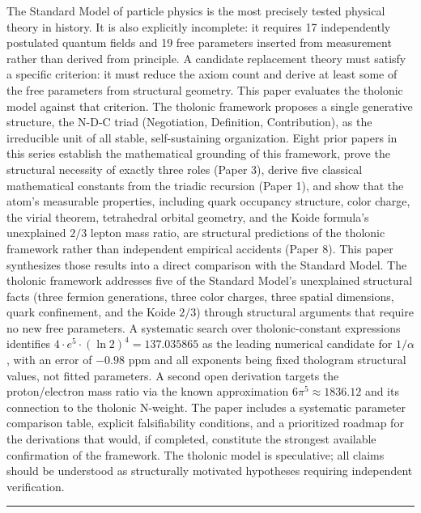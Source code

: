 \documentclass[
  11pt,
  letterpaper,
]{article}
\begin{document}
The Standard Model of particle physics is the most precisely tested
physical theory in history. It is also explicitly incomplete: it
requires 17 independently postulated quantum fields and 19 free
parameters inserted from measurement rather than derived from principle.
A candidate replacement theory must satisfy a specific criterion: it
must reduce the axiom count and derive at least some of the free
parameters from structural geometry. This paper evaluates the tholonic
model against that criterion. The tholonic framework proposes a single
generative structure, the N-D-C triad (Negotiation, Definition,
Contribution), as the irreducible unit of all stable, self-sustaining
organization. Eight prior papers in this series establish the
mathematical grounding of this framework, prove the structural necessity
of exactly three roles (Paper 3), derive five classical mathematical
constants from the triadic recursion (Paper 1), and show that the atom's
measurable properties, including quark occupancy structure, color
charge, the virial theorem, tetrahedral orbital geometry, and the Koide
formula's unexplained \(2/3\) lepton mass ratio, are structural
predictions of the tholonic framework rather than independent empirical
accidents (Paper 8). This paper synthesizes those results into a direct
comparison with the Standard Model. The tholonic framework addresses
five of the Standard Model's unexplained structural facts (three fermion
generations, three color charges, three spatial dimensions, quark
confinement, and the Koide \(2/3\)) through structural arguments that
require no new free parameters. A systematic search over
tholonic-constant expressions identifies
\(4 \cdot e^5 \cdot (\ln 2)^4 = 137.035865\) as the leading numerical
candidate for \(1/\alpha\), with an error of \(-0.98\) ppm and all
exponents being fixed thologram structural values, not fitted
parameters. A second open derivation targets the proton/electron mass
ratio via the known approximation \(6\pi^5 \approx 1836.12\) and its
connection to the tholonic N-weight. The paper includes a systematic
parameter comparison table, explicit falsifiability conditions, and a
prioritized roadmap for the derivations that would, if completed,
constitute the strongest available confirmation of the framework. The
tholonic model is speculative; all claims should be understood as
structurally motivated hypotheses requiring independent verification.

\begin{center}\rule{0.5\linewidth}{0.5pt}\end{center}
\end{document}
